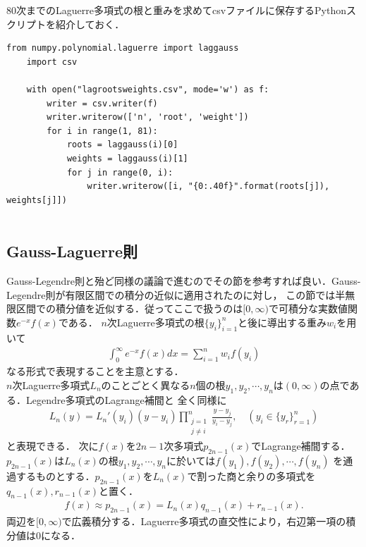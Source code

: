 \documentclass[a4j,papersize,disablejfam,slide,14pt]{jsarticle}
\def\exp#1{e^{#1}} %
\begin{document}
    $80$次までの{\rm Laguerre}多項式の根と重みを求めて{\rm csv}ファイルに保存する{\rm Python}スクリプトを紹介しておく．
    \begin{lstlisting}[style=customPython]
    from numpy.polynomial.laguerre import laggauss
	import csv
	
	with open("lagrootsweights.csv", mode='w') as f:
    	writer = csv.writer(f)
    	writer.writerow(['n', 'root', 'weight'])
    	for i in range(1, 81):
        	roots = laggauss(i)[0]
        	weights = laggauss(i)[1]
        	for j in range(0, i):
            	writer.writerow([i, "{0:.40f}".format(roots[j]), weights[j]])
    
    \end{lstlisting}

\subsection{{\rm Gauss-Laguerre}則}
	{\rm Gauss-Legendre}則と殆ど同様の議論で進むのでその節を参考すれば良い．{\rm Gauss-Legendre}則が有限区間での積分の近似に適用されたのに対し，
    この節では半無限区間での積分値を近似する．従ってここで扱うのは$[0, \infty)$で可積分な実数値関数$\exp{-x} f(x)$である．
    $n$次{\rm Laguerre}多項式の根$\{y_i\}_{i=1}^{n}$と後に導出する重み$w_i$を用いて
    \begin{align}
    	\int_{0}^{\infty} \exp{-x}f(x) dx = \sum_{i=1}^{n} w_i f(y_i)
    \end{align}
    なる形式で表現することを主意とする．\\
    $n$次{\rm Laguerre}多項式$L_n$のことごとく異なる$n$個の根$y_1, y_2, \cdots, y_n$は$(0, \infty)$の点である．{\rm Legendre}多項式の{\rm Lagrange}補間と
    全く同様に
    \begin{align}
    	L_n(y) = L_n'(y_i)(y - y_i)\prod_{\substack{j=1 \\ j \neq i}}^{n} \frac{y-y_j}{y_i-y_j}, \quad (y_i \in \{y_r\}_{r=1}^{n})
    \end{align}
    と表現できる．
    次に$f(x)$を$2n-1$次多項式$p_{2n-1}(x)$で{\rm Lagrange}補間する．$p_{2n-1}(x)$は$L_n(x)$の根$y_1, y_2, \cdots, y_n$に於いては$f(y_1), f(y_2), \cdots, f(y_n)$
    を通過するものとする．$p_{2n-1}(x)$を$L_n(x)$で割った商と余りの多項式を$q_{n-1}(x), r_{n-1}(x)$と置く．
    \begin{align}
    	f(x) \approx p_{2n-1}(x) = L_n(x)q_{n-1}(x) + r_{n-1}(x).
    \end{align}
    両辺を$[0, \infty)$で広義積分する．{\rm Laguerre}多項式の直交性により，右辺第一項の積分値は$0$になる．
\end{document}
